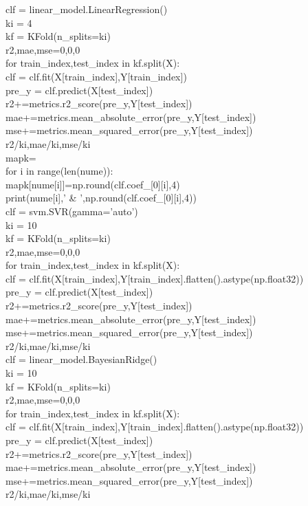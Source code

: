 \documentclass{xcumcmart}
\begin{document}
clf = linear\_model.LinearRegression()  \\
ki = 4  \\
kf = KFold(n\_splits=ki)  \\
r2,mae,mse=0,0,0  \\
for train\_index,test\_index in kf.split(X):  \\
    clf = clf.fit(X[train\_index],Y[train\_index])  \\
    pre\_y = clf.predict(X[test\_index])  \\
    r2+=metrics.r2\_score(pre\_y,Y[test\_index])  \\
    mae+=metrics.mean\_absolute\_error(pre\_y,Y[test\_index])  \\
    mse+=metrics.mean\_squared\_error(pre\_y,Y[test\_index])  \\
r2/ki,mae/ki,mse/ki  \\
mapk={}  \\
for i in range(len(nume)):  \\
    mapk[nume[i]]=np.round(clf.coef\_[0][i],4)  \\
    print(nume[i],' \& ',np.round(clf.coef\_[0][i],4))  \\
clf = svm.SVR(gamma='auto')  \\
ki = 10  \\
kf = KFold(n\_splits=ki)  \\
r2,mae,mse=0,0,0  \\
for train\_index,test\_index in kf.split(X):  \\
    clf = clf.fit(X[train\_index],Y[train\_index].flatten().astype(np.float32))  \\
    pre\_y = clf.predict(X[test\_index])  \\
    r2+=metrics.r2\_score(pre\_y,Y[test\_index])  \\
    mae+=metrics.mean\_absolute\_error(pre\_y,Y[test\_index])  \\
    mse+=metrics.mean\_squared\_error(pre\_y,Y[test\_index])  \\
r2/ki,mae/ki,mse/ki  \\

clf = linear\_model.BayesianRidge()  \\
ki = 10  \\
kf = KFold(n\_splits=ki)  \\
r2,mae,mse=0,0,0  \\
for train\_index,test\_index in kf.split(X):  \\
    clf = clf.fit(X[train\_index],Y[train\_index].flatten().astype(np.float32))  \\
    pre\_y = clf.predict(X[test\_index])  \\
    r2+=metrics.r2\_score(pre\_y,Y[test\_index])  \\
    mae+=metrics.mean\_absolute\_error(pre\_y,Y[test\_index])  \\
    mse+=metrics.mean\_squared\_error(pre\_y,Y[test\_index])  \\
r2/ki,mae/ki,mse/ki  \\
\end{document}

